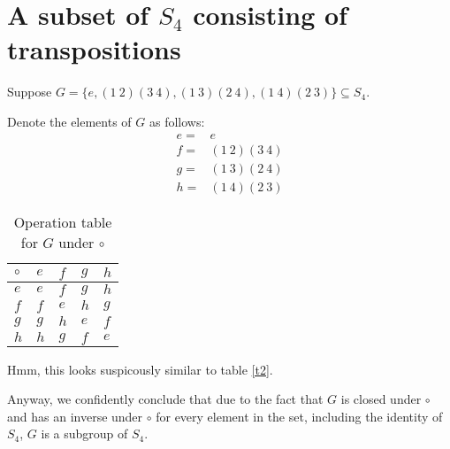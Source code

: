 \documentclass[12pt]{article}
\begin{document}
\section{A subset of $S_4$ consisting of transpositions}

Suppose $G = \{ e, (1\ 2)(3\ 4), (1\ 3)(2\ 4), (1\ 4)(2\ 3) \} \subseteq S_4$.

Denote the elements of $G$ as follows:
\begin{align}
	e = & e \\
	f = & (1\ 2)(3\ 4) \\
	g = & (1\ 3)(2\ 4) \\
	h = & (1\ 4)(2\ 3)
\end{align}

\begin{table}[!ht] 
\begin{tabular}{l|llll}
	$\circ$ & $e$ & $f$ & $g$ & $h$ \\ \hline
	$e$ & $e$ & $f$ & $g$ & $h$ \\
	$f$ & $f$ & $e$ & $h$ & $g$ \\
	$g$ & $g$ & $h$ & $e$ & $f$ \\
	$h$ & $h$ & $g$ & $f$ & $e$ \\
\end{tabular}
\centering
\caption{Operation table for $G$ under $\circ$}
\label{t5}
\end{table}

Hmm, this looks suspicously similar to table \ref{t2}.

Anyway, we confidently conclude that
due to the fact that $G$
is closed under $\circ$
and has an inverse under $\circ$
for every element in the set,
including the identity of $S_4$,
$G$ is a subgroup of $S_4$.
\end{document}
